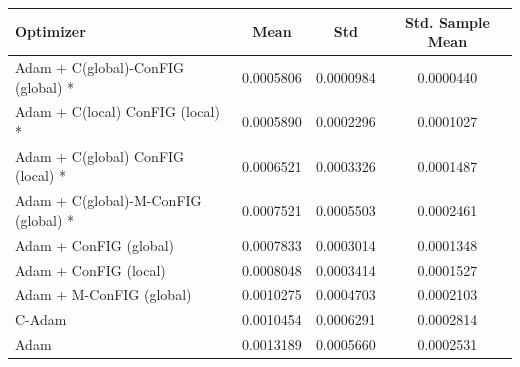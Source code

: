 \begin{table}[H]
    \centering
    \label{tab:optimizer_results}
    \begin{tabular}{lccc}
        \toprule
        \textbf{Optimizer} & \textbf{Mean} & \textbf{Std} & \textbf{Std. Sample Mean} \\
        \midrule
        Adam + C(global)-ConFIG (global) * & 0.0005806 & 0.0000984 & 0.0000440 \\
        Adam + C(local) ConFIG (local) * & 0.0005890 & 0.0002296 & 0.0001027 \\
        Adam + C(global) ConFIG (local) * & 0.0006521 & 0.0003326 & 0.0001487 \\
        Adam + C(global)-M-ConFIG (global) * & 0.0007521 & 0.0005503 & 0.0002461 \\
        Adam + ConFIG (global) & 0.0007833 & 0.0003014 & 0.0001348 \\
        Adam + ConFIG (local) & 0.0008048 & 0.0003414 & 0.0001527 \\
        Adam + M-ConFIG (global) & 0.0010275 & 0.0004703 & 0.0002103 \\
        C-Adam & 0.0010454 & 0.0006291 & 0.0002814 \\
        Adam & 0.0013189 & 0.0005660 & 0.0002531 \\
        \bottomrule
    \end{tabular}
\end{table}
